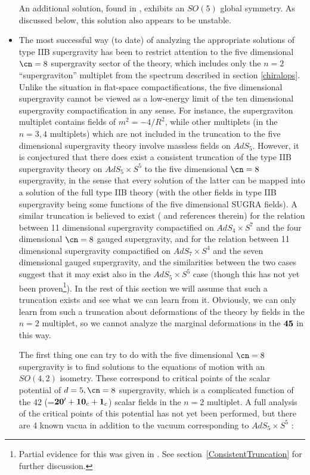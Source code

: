 \begin{itemize}
 An additional solution, found in \cite{vanNieuwenhuizen:1985ri},
 exhibits an $SO(5)$ global symmetry. As discussed below,
 this solution also appears to be unstable.

 \item{} The most successful way (to date) of analyzing the
 appropriate solutions of type IIB supergravity has been to restrict
 attention to the five dimensional $\cn=8$ supergravity
 \cite{Gunaydin:1986cu} sector of the theory, which includes only the
 $n=2$ ``supergraviton'' multiplet from the spectrum described in
 section \ref{chiralops}. Unlike the situation in flat-space
 compactifications, the five dimensional supergravity cannot be viewed
 as a low-energy limit of the ten dimensional supergravity
 compactification in any sense. For instance, the supergraviton
 multiplet contains fields of $m^2=-4/R^2$, while other multiplets (in
 the $n=3,4$ multiplets) which are not included in the truncation to
 the five dimensional supergravity theory involve massless fields on
 $AdS_5$. However, it is conjectured that there does exist a
 consistent truncation of the type IIB supergravity theory on
 $AdS_5\times S^5$ to the five dimensional $\cn=8$ supergravity, in
 the sense that every solution of the latter can be mapped into a
 solution of the full type IIB theory (with the other fields in type
 IIB supergravity being some functions of the five dimensional SUGRA
 fields). A similar truncation is believed to exist (\cite{deWit:1987iy,
 vN:99ct} and references therein)
 for the relation between 11 dimensional supergravity compactified on
 $AdS_4\times S^7$ and the four dimensional $\cn=8$ gauged
 supergravity, and
 for the relation between 11 dimensional supergravity compactified
 on $AdS_7\times S^4$ and the seven dimensional gauged supergravity, 
 and the similarities between the two cases suggest that
 it may exist also in the $AdS_5\times S^5$ case (though this has not
 yet been proven\footnote{Partial evidence for this was given in
 \cite{Cvetic:1999xp}.  See section~\ref{ConsistentTruncation} for
        further discussion.}). In the rest of this section we will assume
 that such a truncation exists and see what we can learn from
 it. Obviously, we can only learn from such a truncation about
 deformations of the theory by fields in the $n=2$ multiplet, so we
 cannot analyze the marginal deformations in the $\bf 45$ in this way.

 The first thing one can try to do with the five dimensional $\cn=8$
 supergravity is to find solutions to the equations of motion with an
 $SO(4,2)$ isometry. These correspond to critical points of the scalar
 potential of $d=5,\cn=8$ supergravity, which is a complicated
 function of the 42 (=${\bf 20'} + {\bf 10}_c + {\bf 1}_c$) scalar
 fields in the $n=2$ multiplet. A full analysis of the critical points
 of this potential has not yet been performed, but there are 4 known
 vacua in addition to the vacuum corresponding to $AdS_5\times S^5$ :


\end{itemize}
